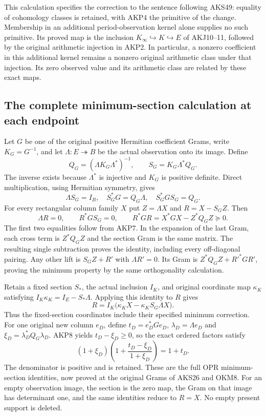 \documentclass[11pt,a4paper]{article}
\begin{document}
This calculation specifies the correction to the sentence following
AKS49: equality of cohomology classes is retained, with AKP4 the
primitive of the change. Membership in an additional period-observation
kernel alone supplies no such primitive. Its proved map is the inclusion
$K_\infty\hookrightarrow K\hookrightarrow E$ of AKJ10--11, followed by
the original arithmetic injection in AKP2. In particular, a nonzero
coefficient in this additional kernel remains a nonzero original
arithmetic class under that injection. Its zero observed value and its
arithmetic class are related by these exact maps.

\subsection{The complete minimum-section calculation at each endpoint}
Let $G$ be one of the original positive Hermitian coefficient Grams,
write $K_G=G^{-1}$, and let $\Lambda:E\twoheadrightarrow B$ be the
actual observation onto its image. Define
\[
 Q_G=(\Lambda K_G\Lambda^*)^{-1},\qquad
 S_G=K_G\Lambda^*Q_G.
 \tag{AKP6}
\]
The inverse exists because $\Lambda^*$ is injective and $K_G$ is
positive definite. Direct multiplication, using Hermitian symmetry,
gives
\[
 \Lambda S_G=I_B,\quad S_G^*G=Q_G\Lambda,\quad
 S_G^*GS_G=Q_G.
 \tag{AKP7}
\]
For every rectangular column family $X$ put $Z=\Lambda X$ and
$R=X-S_GZ$. Then
\[
 \Lambda R=0,\qquad R^*GS_G=0,\qquad
 R^*GR=X^*GX-Z^*Q_GZ\succeq0.
 \tag{AKP8}
\]
The first two equalities follow from AKP7. In the expansion of the
last Gram, each cross term is $Z^*Q_GZ$ and the section Gram is the
same matrix. The resulting single subtraction proves the identity,
including every off-diagonal pairing. Any other lift is $S_GZ+R'$
with $\Lambda R'=0$. Its Gram is $Z^*Q_GZ+R'^*GR'$, proving the
minimum property by the same orthogonality calculation.

Retain a fixed section $S_*$, the actual inclusion $I_K$, and original
coordinate map $\kappa_K$ satisfying
$I_K\kappa_K=I_E-S_*\Lambda$. Applying this identity to $R$ gives
\[
 R=I_K\bigl(\kappa_KX-\kappa_KS_G\Lambda X\bigr).
 \tag{AKP9}
\]
Thus the fixed-section coordinates include their specified minimum
correction. For one original new column $e_D$, define
$t_D=e_D^*Ge_D$, $\lambda_D=\Lambda e_D$ and
$\xi_D=\lambda_D^*Q_G\lambda_D$. AKP8 yields
$t_D-\xi_D\ge0$, so the exact ordered factors satisfy
\[
 (1+\xi_D)\left(1+\frac{t_D-\xi_D}{1+\xi_D}\right)=1+t_D.
 \tag{AKP10}
\]
The denominator is positive and is retained. These are the full OPR
minimum-section identities, now proved at the original Grams of
AKS26 and OKM8. For an empty observation image, the section is the
zero map, the Gram on that image has determinant one, and the same
identities reduce to $R=X$. No empty present support is deleted.
\end{document}
